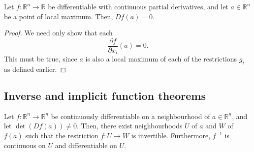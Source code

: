 \documentclass[11pt]{article}
\newcommand{\R}{\mathbb{R}}
\newcommand{\pp}[2]{\frac{\partial #1}{\partial #2}}
\theoremstyle{definition}
\theoremstyle{remark}
\numberwithin{equation}{section}
\begin{document}
    \begin{theorem}
        Let $f\colon \R^n \to \R$ be differentiable with continuous partial
        derivatives, and let $a \in \R^n$ be a point of local maximum. Then, $Df(a) =
        0$.
    \end{theorem}
    \begin{proof}
        We need only show that each \[
            \pp{f}{x_i}(a) = 0.
        \] This must be true, since $a$ is also a local maximum of each of the
        restrictions $g_i$ as defined earlier.
    \end{proof}

    \subsection{Inverse and implicit function theorems}
    \begin{theorem}
        Let $f\colon \R^n \to \R^n$ be continuously differentiable on a neighbourhood
        of $a \in \R^n$, and let $\det(Df(a)) \neq 0$. Then, there exist neighbourhoods
        $U$ of $a$ and $W$ of $f(a)$ such that the restriction $f\colon U \to W$ is
        invertible. Furthermore, $f^{-1}$ is continuous on $U$ and differentiable on
        $U$.
    \end{theorem}
\end{document}
